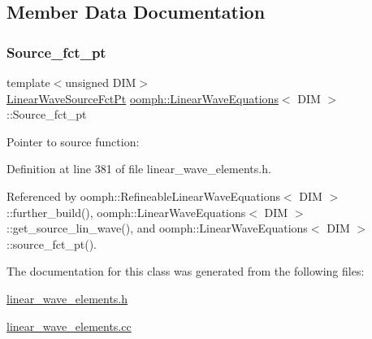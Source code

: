 \subsection{Member Data Documentation}
\mbox{\label{classoomph_1_1LinearWaveEquations_abdbae7c7594a53c7d5d5e73c13ea7cb2}} 
\subsubsection{\texorpdfstring{Source\+\_\+fct\+\_\+pt}{Source\_fct\_pt}}
{\footnotesize\ttfamily template$<$unsigned D\+IM$>$ \\
\hyperlink{classoomph_1_1LinearWaveEquations_a9648dd63c18bab6854d362d16f01e33d}{Linear\+Wave\+Source\+Fct\+Pt} \hyperlink{classoomph_1_1LinearWaveEquations}{oomph\+::\+Linear\+Wave\+Equations}$<$ D\+IM $>$\+::Source\+\_\+fct\+\_\+pt\hspace{0.3cm}{\ttfamily [protected]}}



Pointer to source function\+: 



Definition at line 381 of file linear\+\_\+wave\+\_\+elements.\+h.



Referenced by oomph\+::\+Refineable\+Linear\+Wave\+Equations$<$ D\+I\+M $>$\+::further\+\_\+build(), oomph\+::\+Linear\+Wave\+Equations$<$ D\+I\+M $>$\+::get\+\_\+source\+\_\+lin\+\_\+wave(), and oomph\+::\+Linear\+Wave\+Equations$<$ D\+I\+M $>$\+::source\+\_\+fct\+\_\+pt().



The documentation for this class was generated from the following files\+:\begin{DoxyCompactItemize}
\item 
\hyperlink{linear__wave__elements_8h}{linear\+\_\+wave\+\_\+elements.\+h}\item 
\hyperlink{linear__wave__elements_8cc}{linear\+\_\+wave\+\_\+elements.\+cc}\end{DoxyCompactItemize}
